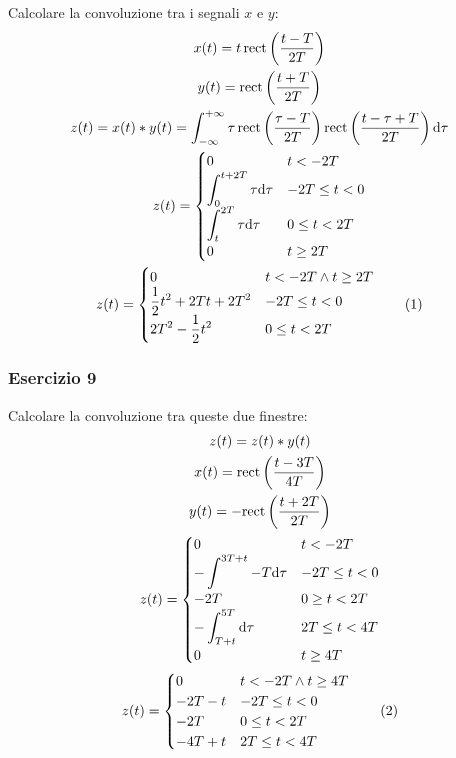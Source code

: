 \documentclass{article}
\newcommand{\rect}{\mathrm{rect}}
\newcommand{\df}{\mathrm{d}}
\newcommand{\tageq}{\tag{\stepcounter{equation}\theequation}}
\begin{document}
Calcolare la convoluzione tra i segnali $x$ e $y$:
\begin{gather*}
    x(t)=\displaystyle t\,\rect\left(\frac{t-T}{2T}\right)\\
    y(t)=\displaystyle\rect\left(\frac{t+T}{2T}\right)\\
    z(t)=x(t)*y(t)=\displaystyle\int_{-\infty}^{+\infty}\tau\,\rect\left(\frac{\tau-T}{2T}\right)\rect\left(\frac{t-\tau+T}{2T}\right)\df\tau\\
    z(t)=\begin{cases}
        0&t<-2T\\
        \displaystyle\int_{0}^{t+2T}\tau \df\tau&-2T\leq t<0\\
        \displaystyle\int_{t}^{2T}\tau \df\tau&0\leq t<2T\\
        0&t\geq2T
    \end{cases}\\
    z(t)=\begin{cases}
        0&t<-2T\land t\geq2T\\
        \displaystyle\frac{1}{2}t^2+2Tt+2T^2&-2T\leq t<0\\
        \displaystyle2T^2-\frac{1}{2}t^2&0\leq t<2T
    \end{cases}\tageq
\end{gather*}

\subsubsection*{Esercizio 9}

Calcolare la convoluzione tra queste due finestre:
\begin{gather*}
    z(t)=z(t)*y(t)\\
    x(t)=\displaystyle\rect\left(\frac{t-3T}{4T}\right)\\
    y(t)=-\displaystyle\rect\left(\frac{t+2T}{2T}\right)\\
    z(t)=\begin{cases}
        0&t<-2T\\
        -\displaystyle\int^{3T+t}-{T}\df\tau&-2T\leq t<0\\
        -2T&0\geq t<2T\\
        -\displaystyle\int_{T+t}^{5T}\df\tau&2T\leq t<4T\\
        0&t\geq 4T
    \end{cases}\\
    z(t)=\begin{cases}
        0&t<-2T \land t\geq 4T\\
        -2T-t&-2T\leq t<0\\
        -2T&0\leq t<2T\\
        -4T+t&2T\leq t<4T
    \end{cases}\tageq
\end{gather*}
\end{document}
